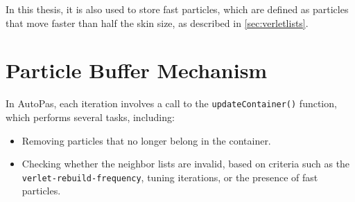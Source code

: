 
In this thesis, it is also used to store fast particles, which are defined as particles that move faster than half the skin size, as described in \ref{sec:verletlists}.


\section{Particle Buffer Mechanism}

In AutoPas, each iteration involves a call to the 	\texttt{updateContainer()} function, which performs several tasks, including:
\begin{itemize}
    \item Removing particles that no longer belong in the container.
    \item Checking whether the neighbor lists are invalid, based on criteria such as the \texttt{verlet-rebuild-frequency}, tuning iterations, or the presence of fast particles.
\end{itemize}






